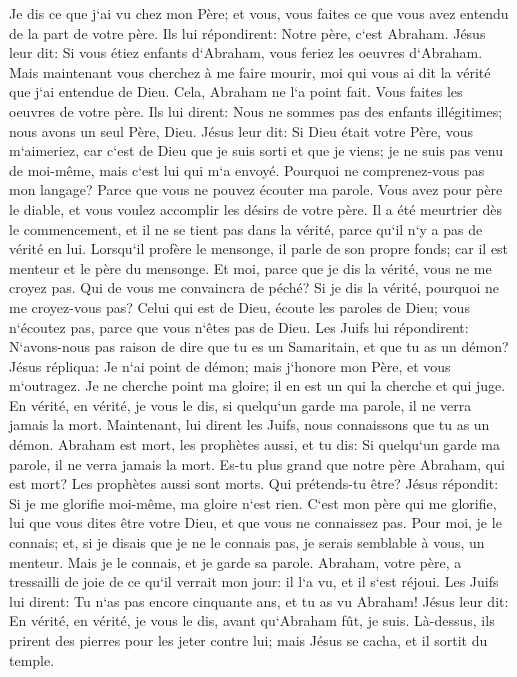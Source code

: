 \verse Je dis ce que j`ai vu chez mon Père; et vous, vous faites ce que vous avez entendu de la part de votre père. 
\verse Ils lui répondirent: Notre père, c`est Abraham. Jésus leur dit: Si vous étiez enfants d`Abraham, vous feriez les oeuvres d`Abraham. 
\verse Mais maintenant vous cherchez à me faire mourir, moi qui vous ai dit la vérité que j`ai entendue de Dieu. Cela, Abraham ne l`a point fait. 
\verse Vous faites les oeuvres de votre père. Ils lui dirent: Nous ne sommes pas des enfants illégitimes; nous avons un seul Père, Dieu. 
\verse Jésus leur dit: Si Dieu était votre Père, vous m`aimeriez, car c`est de Dieu que je suis sorti et que je viens; je ne suis pas venu de moi-même, mais c`est lui qui m`a envoyé. 
\verse Pourquoi ne comprenez-vous pas mon langage? Parce que vous ne pouvez écouter ma parole. 
\verse Vous avez pour père le diable, et vous voulez accomplir les désirs de votre père. Il a été meurtrier dès le commencement, et il ne se tient pas dans la vérité, parce qu`il n`y a pas de vérité en lui. Lorsqu`il profère le mensonge, il parle de son propre fonds; car il est menteur et le père du mensonge. 
\verse Et moi, parce que je dis la vérité, vous ne me croyez pas. 
\verse Qui de vous me convaincra de péché? Si je dis la vérité, pourquoi ne me croyez-vous pas? 
\verse Celui qui est de Dieu, écoute les paroles de Dieu; vous n`écoutez pas, parce que vous n`êtes pas de Dieu. 
\verse Les Juifs lui répondirent: N`avons-nous pas raison de dire que tu es un Samaritain, et que tu as un démon? 
\verse Jésus répliqua: Je n`ai point de démon; mais j`honore mon Père, et vous m`outragez. 
\verse Je ne cherche point ma gloire; il en est un qui la cherche et qui juge. 
\verse En vérité, en vérité, je vous le dis, si quelqu`un garde ma parole, il ne verra jamais la mort. 
\verse Maintenant, lui dirent les Juifs, nous connaissons que tu as un démon. Abraham est mort, les prophètes aussi, et tu dis: Si quelqu`un garde ma parole, il ne verra jamais la mort. 
\verse Es-tu plus grand que notre père Abraham, qui est mort? Les prophètes aussi sont morts. Qui prétends-tu être? 
\verse Jésus répondit: Si je me glorifie moi-même, ma gloire n`est rien. C`est mon père qui me glorifie, lui que vous dites être votre Dieu, 
\verse et que vous ne connaissez pas. Pour moi, je le connais; et, si je disais que je ne le connais pas, je serais semblable à vous, un menteur. Mais je le connais, et je garde sa parole. 
\verse Abraham, votre père, a tressailli de joie de ce qu`il verrait mon jour: il l`a vu, et il s`est réjoui. 
\verse Les Juifs lui dirent: Tu n`as pas encore cinquante ans, et tu as vu Abraham! 
\verse Jésus leur dit: En vérité, en vérité, je vous le dis, avant qu`Abraham fût, je suis. 
\verse Là-dessus, ils prirent des pierres pour les jeter contre lui; mais Jésus se cacha, et il sortit du temple. 

